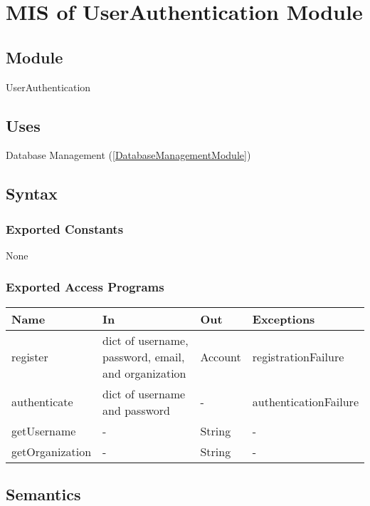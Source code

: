 \documentclass[12pt, titlepage]{article}
\begin{document}
\section{MIS of UserAuthentication Module} \label{AuthenticationModule}

\subsection{Module}

UserAuthentication

\subsection{Uses}

Database Management (\ref{DatabaseManagementModule})

\subsection{Syntax}

\subsubsection{Exported Constants}

None


\subsubsection{Exported Access Programs}

\begin{center}
\begin{tabular}{p{4cm} p{4cm} p{2cm} p{4cm}}
\hline
\textbf{Name} & \textbf{In} & \textbf{Out} & \textbf{Exceptions} \\
\hline
register & dict of username, password, email, and organization & Account & registrationFailure \\
\hline
authenticate & dict of username and password & - & authenticationFailure \\
\hline
getUsername & - & String & - \\
\hline
getOrganization & - & String & - \\
\hline
\end{tabular}
\end{center}

\subsection{Semantics}
\end{document}
